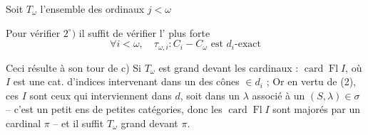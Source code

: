  Soit $T_\omega$ l'ensemble des ordinaux $j<\omega$

Pour vérifier $2^\circ)$ il suffit de vérifier l' plus forte
\[
 \forall i<\omega,\quad\tau_{\omega,i}:C_i-C_\omega\text{ est }d_i\text{-exact}\tag*{(3)}
\]

Ceci résulte à son tour de c) Si $T_\omega$ est grand devant les cardinaux : $\operatorname{card}\operatorname{Fl} I$, où $I$ est une cat. d'indices intervenant dans un des cônes $\in d_i$ ; Or en vertu de (2), ces $I$  sont  ceux qui interviennent dans $d$, soit dans un $\lambda$ associé à un $(S,\lambda)\in\sigma$ -- c'est un petit ens de petites catégories, donc les $\operatorname{card}\operatorname{Fl}I$ sont majorés par un cardinal $\pi$ -- et il suffit $T_\omega$ grand devant $\pi$.

